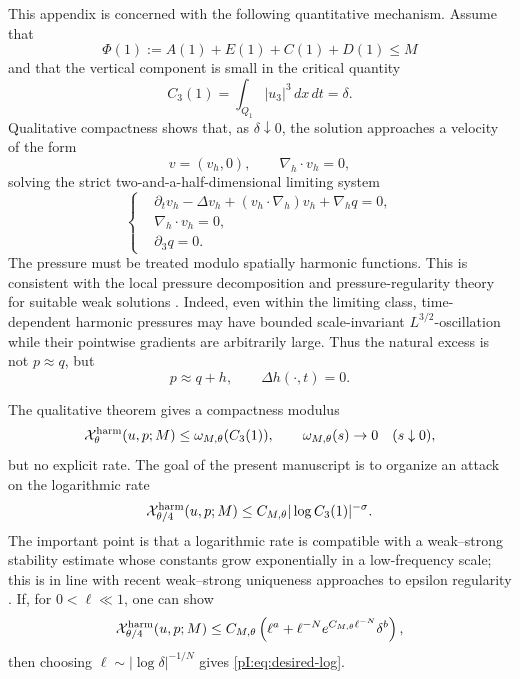 \documentclass[11pt]{article}
\numberwithin{equation}{section}
\theoremstyle{plain}
\theoremstyle{definition}
\theoremstyle{remark}
\newcommand{\nabh}{\nabla_h}
\newcommand{\divh}{\nabla_h\!\cdot}
\newcommand{\calX}{\mathcal X}
\begin{document}
This appendix is concerned with the following quantitative mechanism.  Assume that
\[
        \Phi(1):=A(1)+E(1)+C(1)+D(1)\le M
\]
and that the vertical component is small in the critical quantity
\[
        C_3(1)=\int_{Q_1}|u_3|^3\,dx\,dt=\delta.
\]
Qualitative compactness shows that, as \(\delta\downarrow0\), the solution approaches a velocity of the form
\[
        v=(v_h,0),\qquad \divh v_h=0,
\]
solving the strict two-and-a-half-dimensional limiting system
\begin{equation}\label{pI:eq:strict-LS}
\left\{
\begin{aligned}
&\partial_t v_h-\Delta v_h+(v_h\cdot\nabh)v_h+\nabh q=0,\\
&\divh v_h=0,\\
&\partial_3q=0.
\end{aligned}
\right.
\end{equation}
The pressure must be treated modulo spatially harmonic functions.  This is consistent with the local pressure decomposition and pressure-regularity theory for suitable weak solutions \cite{SohrWahl1986,SereginSverak2002,Seregin2007Morrey,Seregin2015,Wolf2017}.  Indeed, even within the limiting class, time-dependent harmonic pressures may have bounded scale-invariant \(L^{3/2}\)-oscillation while their pointwise gradients are arbitrarily large.  Thus the natural excess is not \(p\approx q\), but
\[
        p\approx q+h,
        \qquad
        \Delta h(\cdot,t)=0.
\]

The qualitative theorem gives a compactness modulus
\[
        \calX^{\rm harm}_\theta(u,p;M)\le \omega_{M,\theta}(C_3(1)),
        \qquad
        \omega_{M,\theta}(s)\to0 \quad(s\downarrow0),
\]
but no explicit rate.  The goal of the present manuscript is to organize an attack on the logarithmic rate
\begin{equation}\label{pI:eq:desired-log}
        \calX^{\rm harm}_{\theta/4}(u,p;M)
        \le C_{M,\theta}|\log C_3(1)|^{-\sigma}.
\end{equation}
The important point is that a logarithmic rate is compatible with a weak--strong stability estimate whose constants grow exponentially in a low-frequency scale; this is in line with recent weak--strong uniqueness approaches to epsilon regularity \cite{AlbrittonBarkerPrange2023}.  If, for \(0<\ell\ll1\), one can show
\begin{equation}\label{pI:eq:prepared-form-intro}
        \calX^{\rm harm}_{\theta/4}(u,p;M)
        \le C_{M,\theta}
        \left(
        \ell^a+
        \ell^{-N}e^{C_{M,\theta}\ell^{-N}}\delta^b
        \right),
\end{equation}
then choosing \(\ell\sim |\log\delta|^{-1/N}\) gives \eqref{pI:eq:desired-log}.
\end{document}
